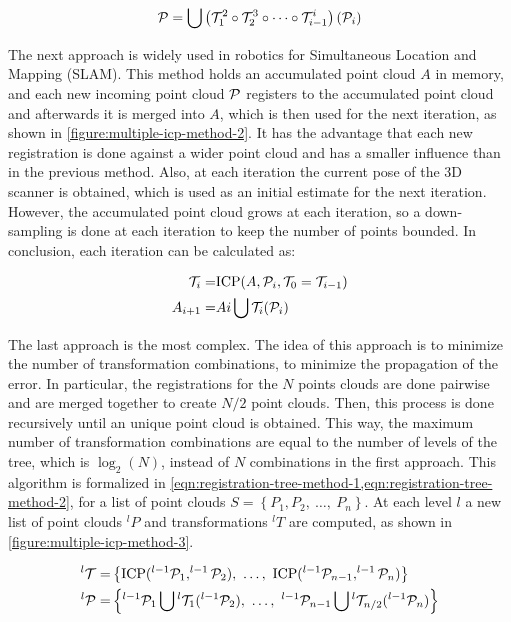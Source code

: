 \begin{equation}
\label{eqn:registration-simple-method-calculation}
    \mathcal{P} = \bigcup{\left(\mathcal{T}_1^2 \circ \mathcal{T}_2^3 \circ \dots \circ \mathcal{T}_{i-1}^i\right)(\mathcal{P}_i)}
\end{equation}

The next approach is widely used in robotics for Simultaneous Location and Mapping (SLAM). This method holds an accumulated point cloud $A$ in memory, and each new incoming point cloud $\mathcal{P}$ registers to the accumulated point cloud and afterwards it is merged into $A$, which is then used for the next iteration, as shown in \cref{figure:multiple-icp-method-2}. It has the advantage that each new registration is done against a wider point cloud and has a smaller influence than in the previous method. Also, at each iteration the current pose of the 3D scanner is obtained, which is used as an initial estimate for the next iteration. However, the accumulated point cloud grows at each iteration, so a down-sampling is done at each iteration to keep the number of points bounded. In conclusion, each iteration can be calculated as:

\begin{align}
    \mathcal{T}_{i} = & \textrm{ICP}(A, \mathcal{P}_{i}, \mathcal{T}_0 = \mathcal{T}_{i-1}) \\
    A_{i+1} = & A{i} \bigcup \mathcal{T}_{i}(\mathcal{P}_i)
\end{align}

The last approach is the most complex. The idea of this approach is to minimize the number of transformation combinations, to minimize the propagation of the error. In particular, the registrations for the $N$ points clouds are done pairwise and are merged together to create $N/2$ point clouds. Then, this process is done recursively until an unique point cloud is obtained. This way, the maximum number of transformation combinations are equal to the number of levels of the tree, which is $\log_2(N)$, instead of $N$ combinations in the first approach. This algorithm is formalized in \cref{eqn:registration-tree-method-1,eqn:registration-tree-method-2}, for a list of point clouds $S=\left\{P_1, P_2, \ \dots, \ P_n\right\}$. At each level $l$ a new list of point clouds $^{l}P$ and transformations $^{l}T$ are computed, as shown in \cref{figure:multiple-icp-method-3}.

\begin{align}
    ^{l}\T = & \left\{\textrm{ICP}(^{l-1}\Pt_1, ^{l-1}\Pt_2), \ \dots, \ \textrm{ICP}(^{l-1}\Pt_{n-1}, ^{l-1}\Pt_{n}) \right\}
        \label{eqn:registration-tree-method-1} \\
    ^{l}\Pt = & \left\{^{l-1}\Pt_1 \bigcup{^{l}\T_1(^{l-1}\Pt_2}), \ \dots, \ ^{l-1}\Pt_{n-1} \bigcup{^{l}\T_{n/2}(^{l-1}\Pt_n)}\right\}
        \label{eqn:registration-tree-method-2}
\end{align}

